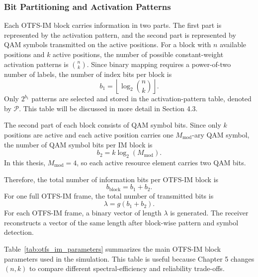 \subsubsection{Bit Partitioning and Activation Patterns}

Each OTFS-IM block carries information in two parts. The first part is represented by the activation pattern, and the second part is represented by QAM symbols transmitted on the active positions. For a block with \(n\) available positions and \(k\) active positions, the number of possible constant-weight activation patterns is \(\binom{n}{k}\). Since binary mapping requires a power-of-two number of labels, the number of index bits per block is
\begin{equation}
    b_1 =
    \left\lfloor
    \log_2 \binom{n}{k}
    \right\rfloor .
    \label{eq:otfs_im_index_bits}
\end{equation}
Only \(2^{b_1}\) patterns are selected and stored in the activation-pattern table, denoted by \(\mathcal{P}\). This table will be discussed in more detail in Section 4.3.

The second part of each block consists of QAM symbol bits. Since only \(k\) positions are active and each active position carries one \(M_{\mathrm{mod}}\)-ary QAM symbol, the number of QAM symbol bits per IM block is
\begin{equation}
    b_2 = k\log_2(M_{\mathrm{mod}}).
    \label{eq:otfs_im_symbol_bits}
\end{equation}
In this thesis, \(M_{\mathrm{mod}}=4\), so each active resource element carries two QAM bits.

Therefore, the total number of information bits per OTFS-IM block is
\begin{equation}
    b_{\mathrm{block}} = b_1 + b_2.
    \label{eq:otfs_im_bits_per_block}
\end{equation}
For one full OTFS-IM frame, the total number of transmitted bits is
\begin{equation}
    \lambda = g(b_1+b_2).
    \label{eq:otfs_im_total_bits}
\end{equation}
For each OTFS-IM frame, a binary vector of length \(\lambda\) is generated. The receiver reconstructs a vector of the same length after block-wise pattern and symbol detection.

Table~\ref{tab:otfs_im_parameters} summarizes the main OTFS-IM block parameters used in the simulation. This table is useful because Chapter 5 changes \((n,k)\) to compare different spectral-efficiency and reliability trade-offs.

